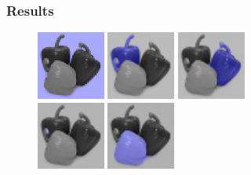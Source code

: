 \documentclass[8pt]{beamer}
\begin{document}
\begin{frame}
\frametitle{Results}

\begin{figure}[ht]
\centering
\includegraphics[width=0.2\textwidth,height=0.2\textwidth]{peppers_seg_1.png} \hspace{.45cm}
\includegraphics[width=0.2\textwidth,height=0.2\textwidth]{peppers_seg_2.png} \hspace{.45cm}
\includegraphics[width=0.2\textwidth,height=0.2\textwidth]{peppers_seg_3.png} \\ \vspace{.45cm}
\includegraphics[width=0.2\textwidth,height=0.2\textwidth]{peppers_seg_4.png} \hspace{.45cm}
\includegraphics[width=0.2\textwidth,height=0.2\textwidth]{peppers_seg_5.png}
\end{figure}

\end{frame}
\end{document}
